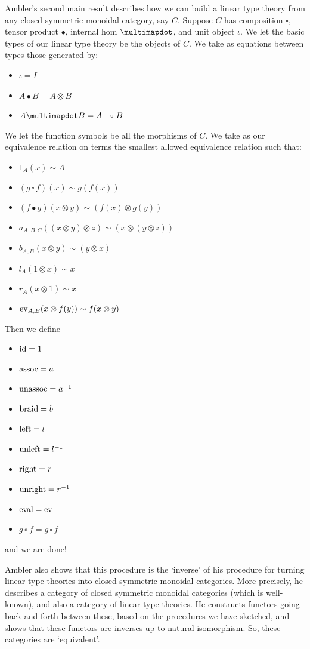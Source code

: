 \documentclass[12pt,twoside,openright]{report}
\newcommand{\lhom}{\multimap}
\newcommand{\tensor}{\otimes}
\newcommand{\Id}{{\rm id}}
\newcommand{\ev}{{\rm ev}}
\newcommand{\eval}{{\rm eval}}
\newcommand{\assoc}{{\rm assoc}}
\newcommand{\unassoc}{{\rm unassoc}}
\newcommand{\braid}{{\rm braid}}
\newcommand{\Left}{{\rm left}}
\newcommand{\Right}{{\rm right}}
\newcommand{\unright}{{\rm unright}}
\newcommand{\unleft}{{\rm unleft}}
\begin{document}
Ambler's second main result describes how we can build a linear type theory from any closed symmetric monoidal category, say $C$.  Suppose $C$ 
has composition $\square$, tensor product $\bullet$, internal hom
$\multimapdot$, and unit object $\iota$.  We let the basic types of our linear type theory be the objects of $C$.  We take as equations between types those generated by:
\begin{itemize}
  \item $\iota = I$
  \item $A \bullet B = A \tensor B$
  \item $A \multimapdot B = A \lhom B$
\end{itemize}
We let the function symbols be all the morphisms of $C$.  We take as our equivalence relation on terms the smallest allowed equivalence relation such that:
\begin{itemize}
  \item $1_A(x) \sim A$
  \item $(g \,\square\, f)(x) \sim g (f(x))$
  \item $(f \bullet g)(x \tensor y) \sim (f(x) \tensor g(y))$
  \item $a_{A,B,C}((x \tensor y) \tensor z) \sim (x \tensor (y \tensor z))$
  \item $b_{A, B}(x \tensor y) \sim (y \tensor x)$
  \item $l_A(1 \tensor x) \sim x$
  \item $r_A(x \tensor 1) \sim x$
  \item $\ev_{A, B}(x \tensor \tilde{f}(y)) \sim f(x \tensor y)$
\end{itemize}
Then we define
\begin{itemize}
  \item $\Id = 1$
  \item $\assoc = a$
  \item $\unassoc = a^{-1}$
  \item $\braid = b$
  \item $\Left = l$
  \item $\unleft = l^{-1}$
  \item $\Right = r$
  \item $\unright = r^{-1}$
  \item $\eval = \ev$
  \item $g \circ f = g \,\square\, f$
\end{itemize}
and we are done!

Ambler also shows that this procedure is the `inverse' of his procedure for turning linear type theories into closed symmetric monoidal categories.  More precisely, he describes a category of closed symmetric monoidal categories (which is well-known), and also a category of linear type theories.  He constructs functors going back and forth between these, based on the procedures we have sketched, and shows that these functors are inverses up to natural isomorphism. So, these categories are `equivalent'.
\end{document}
